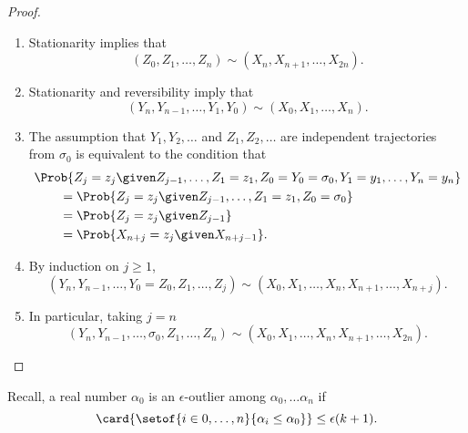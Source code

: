 \documentclass[12pt]{article}
\begin{document}
\begin{proof}
            \begin{enumerate}
                \item
                    Stationarity implies that
                    \[
                        (Z_0, Z_1, \dots, Z_n) \sim (X_n, X_{n+1}, \dots,
                        X_{2n}).
                    \] 
                  \item Stationarity and reversibility imply that
                    \[
                        (Y_n, Y_{n-1}, \dots, Y_1, Y_0) \sim (X_0, X_1,
                        \dots, X_n).
                    \]
                \item
                    The assumption that \( Y_1, Y_2, \dots \) and \( Z_1,
                    Z_2, \dots \) are independent trajectories from \(
                    \sigma_0 \) is equivalent to the condition that
                    \begin{align*}
                        & \Prob{ Z_j = z_j \given Z_{j-1}, \dots, Z_1 =
                        z_1, Z_0 = Y_0=\sigma_0, Y_1=y_1, \dots, Y_n = y_n}
                        \\
                        & \qquad = \Prob{ Z_j = z_j \given Z_{j-1},
                        \dots, Z_1 = z_1, Z_0 = \sigma_0} \\
                        & \qquad = \Prob{ Z_j = z_j \given Z_{j-1}} \\
                        &\qquad = \Prob{ X_{n+j} = z_j \given X_{n+j-1}}.
                    \end{align*}
                \item
                    By induction on \( j \ge 1 \),
                    \[
                        (Y_n, Y_{n-1}, \dots, Y_0=Z_0, Z_1, \dots, Z_j)
                        \sim (X_0, X_1, \dots, X_n, X_{n+1}, \dots, X_{n+j}).
                    \]
                \item
                    In particular, taking \( j = n \)
                    \[
                        (Y_n, Y_{n-1}, \dots, \sigma_0, Z_1, \dots, Z_n)
                        \sim (X_0, X_1, \dots, X_n, X_{n+1}, \dots, X_{2n}).
                    \]
            \end{enumerate}
\end{proof}

Recall, a real number \( \alpha_0 \) is
an \( \epsilon \)-outlier among \( \alpha_0, \dots \alpha_n \) if
\[
    \card{\setof{i \in 0, \dots, n}{ \alpha_i \le \alpha_0 }} \le
    \epsilon(k+1).
\]
\end{document}
